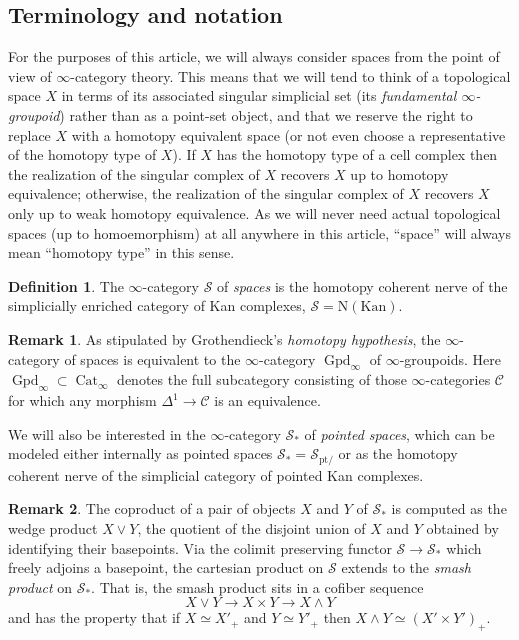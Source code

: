 \documentclass[12pt]{article}
\theoremstyle{definition}
\newtheorem{definition}{Definition}[subsection]
\newtheorem{remark}{Remark}[subsection]
\newcommand{\C}{\mathcal{C}}
\renewcommand{\S}{\mathcal{S}}
\renewcommand{\i}{\infty}
\newcommand{\too}{\longrightarrow}
\DeclareMathOperator{\Cat}{Cat}
\DeclareMathOperator{\Gpd}{Gpd}
\newcommand{\pt}{\mathrm{pt}}
\begin{document}
\subsection{Terminology and notation}


For the purposes of this article, we will always consider spaces from the point of view of $\infty$-category theory.
This means that we will tend to think of a topological space $X$ in terms of its associated singular simplicial set (its {\em fundamental $\infty$-groupoid})
rather than as a point-set object, and that we reserve the right to replace $X$ with a homotopy equivalent space (or not even choose a representative of the homotopy type of $X$). 
If $X$ has the homotopy type of a cell complex then the realization of the singular complex of $X$ recovers $X$ up to homotopy equivalence; otherwise, the realization of the singular complex of $X$ recovers $X$ only up to weak homotopy equivalence.
As we will never need actual topological spaces (up to homoemorphism) at all anywhere in this article, ``space'' will always mean ``homotopy type'' in this sense. 
\begin{definition}
The $\infty$-category $\S$
\index{$\S$}
of {\em spaces} is the homotopy coherent nerve of the simplicially enriched category of Kan complexes, $\S=\mathrm{N}(\mathrm{Kan})$.
\end{definition}
\begin{remark}
As stipulated by Grothendieck's {\em homotopy hypothesis}, the $\infty$-category of spaces is equivalent to the $\infty$-category $\Gpd_\i$ of $\infty$-groupoids.
Here $\Gpd_\i\subset\Cat_\i$
\index{$\Gpd_\i$}
denotes the full subcategory consisting of those $\infty$-categories $\C$ for which any morphism $\Delta^1\to\C$ is an equivalence.
\end{remark}
We will also be interested in the $\infty$-category $\S_*$ of {\em pointed spaces},
\index{$\S_*$}
which can be modeled either internally as pointed spaces $\S_*=\S_{\pt/}$ or as the homotopy coherent nerve of the simplicial category of pointed Kan complexes.
\begin{remark}
The coproduct of a pair of objects $X$ and $Y$ of $\S_*$ is computed as the wedge product $X\lor Y$, the quotient of the disjoint union of $X$ and $Y$ obtained by identifying their basepoints.
Via the colimit preserving functor $\S\to\S_*$
which freely adjoins a basepoint, the cartesian product on $\S$ extends to the {\em smash product}
on $\S_*$.
That is, the smash product sits in a cofiber sequence
\[
X\lor Y\too X\times Y\too X\land Y
\]
and has the property that if $X\simeq X'_+$ and $Y\simeq Y'_+$ then $X\land Y\simeq (X'\times Y')_+$.
\end{remark}
\end{document}

